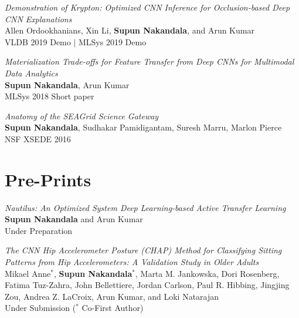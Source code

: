 \documentclass[margin]{res}
\begin{document}
\begin{resume}
\par
\textit{Demonstration of Krypton: Optimized CNN Inference for Occlusion-based Deep CNN Explanations} \\
Allen Ordookhanians, Xin Li, \textbf{Supun Nakandala}, and Arun Kumar\\
VLDB 2019 Demo $|$ MLSys 2019 Demo

\par
\textit{Materialization Trade-offs for Feature Transfer from Deep CNNs for Multimodal Data Analytics} \\
\textbf{Supun Nakandala}, Arun Kumar\\
MLSys 2018 Short paper

\par
\textit{Anatomy of the SEAGrid Science Gateway} \\
\textbf{Supun Nakandala}, Sudhakar Pamidigantam, Suresh Marru, Marlon Pierce\\
NSF XSEDE 2016


\vspace{2mm}
\section{Pre-Prints}
\par
\textit{Nautilus: An Optimized System Deep Learning-based Active Transfer Learning} \\
\textbf{Supun Nakandala} and Arun Kumar\\
Under Preparation

\par
\textit{The CNN Hip Accelerometer Posture (CHAP) Method for Classifying Sitting Patterns from Hip Accelerometers: A Validation Study in Older Adults} \\
Mikael Anne$^*$, \textbf{Supun Nakandala}$^*$, Marta M. Jankowska, Dori Rosenberg, Fatima Tuz-Zahra, John Bellettiere, Jordan Carlson, Paul R. Hibbing, Jingjing Zou, Andrea Z. LaCroix, Arun Kumar, and Loki Natarajan\\
Under Submission
($^*$ Co-First Author)



\end{resume}
\end{document}
